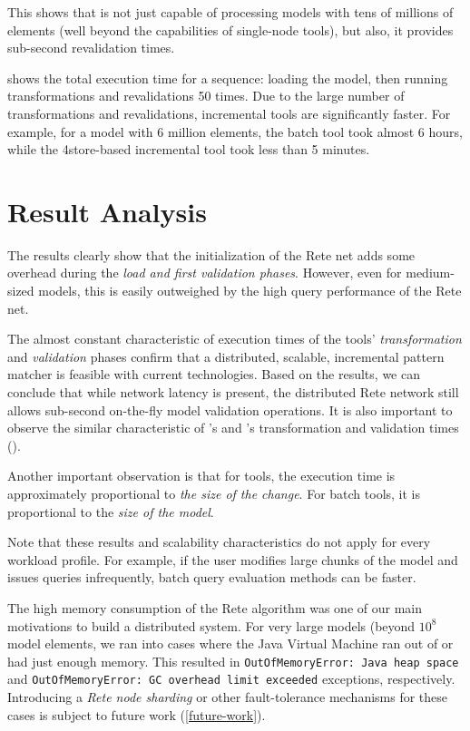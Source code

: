 This shows that \iqd{} is not just capable of processing models with tens of millions of elements (well beyond the capabilities of single-node tools), but also, it provides sub-second revalidation times.


 shows the total execution time for a sequence: loading the model, then running transformations and revalidations 50 times. Due to the large number of transformations and revalidations, incremental tools are significantly faster. For example, for a model with 6 million elements, the batch tool took almost 6 hours, while the 4store-based incremental tool took less than 5 minutes. 

\section{Result Analysis}

The results clearly show that the initialization of the Rete net adds some overhead during the \emph{load and first validation phases}. However, even for medium-sized models, this is easily outweighed by the high query performance of the Rete net.

The almost constant characteristic of execution times of the \iqd{} tools' \emph{transformation} and \emph{validation} phases confirm that a distributed, scalable, incremental pattern matcher is feasible with current technologies. Based on the results, we can conclude that while network latency is present, the distributed Rete network still allows sub-second on-the-fly model validation operations. It is also important to observe the similar characteristic of \iqd{}'s and \eiq{}'s transformation and validation times ().

Another important observation is that for \iqd{} tools, the execution time is approximately proportional to \emph{the size of the change}. For batch tools, it is proportional to the \emph{size of the model}. 

Note that these results and scalability characteristics do not apply for every workload profile. For example, if the user modifies large chunks of the model and issues queries infrequently, batch query evaluation methods can be faster. 

The high memory consumption of the Rete algorithm was one of our main motivations to build a distributed system. For very large models (beyond $10^8$ model elements, we ran into cases where the Java Virtual Machine ran out of or had just enough memory. This resulted in \texttt{OutOfMemoryError: Java heap space} and \texttt{OutOfMemoryError: GC overhead limit exceeded} exceptions, respectively. Introducing a \emph{Rete node sharding} or other fault-tolerance mechanisms for these cases is subject to future work (\autoref{future-work}).


